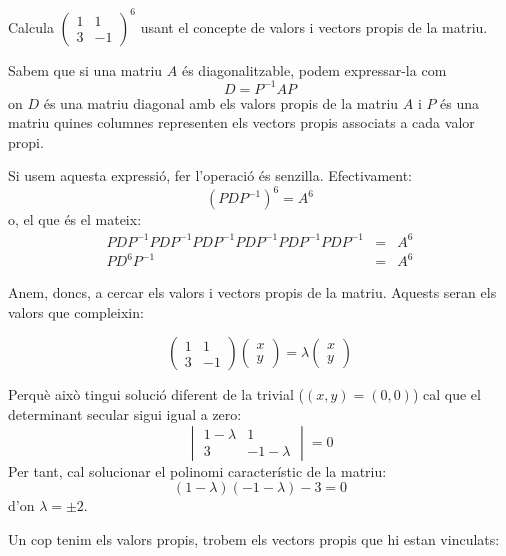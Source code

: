\Exercise Calcula $\begin{pmatrix}1&1\\3&-1\end{pmatrix}^6$ usant el concepte de valors i vectors propis de la matriu.

\Answer
Sabem que si una matriu $A$ és diagonalitzable, podem expressar-la com
\[D=P^{-1}AP\]
on $D$ és una matriu diagonal amb els valors propis de la matriu $A$ i $P$ és una matriu quines columnes representen els vectors propis associats a cada valor propi.

Si usem aquesta expressió, fer l'operació és senzilla. Efectivament:
\[\left(PDP^{-1}\right)^6=A^6\]
o, el que és el mateix:
\begin{eqnarray}
  PDP^{-1}PDP^{-1} PDP^{-1} PDP^{-1}PDP^{-1}PDP^{-1}&=&A^6\nonumber\\
  PD^6P^{-1}&=&A^6\label{eq_A6}
\end{eqnarray}


Anem, doncs, a cercar els valors i vectors propis de la matriu. Aquests seran els valors que compleixin:

\[
  \begin{pmatrix}1&1\\3&-1\end{pmatrix}
  \begin{pmatrix}x\\y\end{pmatrix}=\lambda\begin{pmatrix}x\\y\end{pmatrix}\]

  Perquè això tingui solució diferent de la trivial ($(x,y)=(0,0)$) cal que el determinant secular sigui igual a zero:
  \[
  \begin{vmatrix}1-\lambda&1\\3&-1-\lambda\end{vmatrix}=0  
  \]
  Per tant, cal solucionar el polinomi característic de la matriu:
  \[(1-\lambda)(-1-\lambda)-3=0\]
  d'on $\lambda=\pm 2$.


Un cop tenim els valors propis, trobem els vectors propis que hi estan vinculats:

